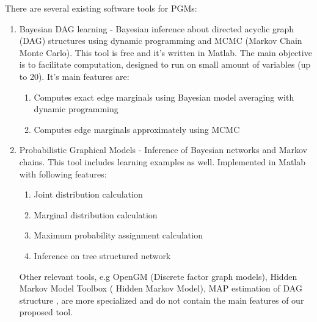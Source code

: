 \documentclass{article}
\newcommand{\comment}[2]{
	\todo[color=GreenYellow,inline]{
		\underline{\textbf{#1:}} #2
	}}
\begin{document}
    
    There are several existing software tools for PGMs:
    \begin{enumerate}
        \item Bayesian DAG learning \cite{KevinMurphy} - Bayesian inference about directed acyclic graph (DAG) structures using dynamic programming and MCMC (Markov Chain Monte Carlo). This tool is free and it's written in Matlab. The main objective is to facilitate computation, designed to run on small amount of variables (up to 20). It's main features are:
        \begin{enumerate}
            \item Computes exact edge marginals using Bayesian model averaging with dynamic programming
            \item Computes edge marginals approximately using MCMC
        \end{enumerate}
        \item Probabilistic Graphical Models \cite{Probabilistic Graphical Model Library} - Inference of Bayesian networks and Markov chains. This tool includes learning examples as well. Implemented in Matlab with following features:
        \begin{enumerate}
            \item Joint distribution calculation
            \item Marginal distribution calculation
            \item Maximum probability assignment calculation
            \item Inference on tree structured network
        \end{enumerate}
        Other relevant tools, e.g OpenGM \cite{OpenGM} (Discrete factor graph models), Hidden Markov Model Toolbox \cite{Hidden Markov Model Toolbox} ( Hidden Markov Model), MAP estimation of DAG structure \cite{MAPEstimation}, are more specialized and do not contain the main features of our proposed tool.

\end{enumerate}
\end{document}
